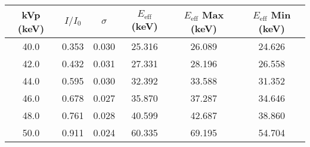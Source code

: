 \begin{tabular}{cccccc}
\toprule
 kVp (keV) &  $I/I_0$ &  $\sigma$ &  $E_{\text{eff}}$ (keV) &  $E_{\text{eff}}$ Max (keV) &  $E_{\text{eff}}$ Min (keV) \\
\midrule
      40.0 &               0.353 &                                  0.030 &                  25.316 &                      26.089 &                      24.626 \\
      42.0 &               0.432 &                                  0.031 &                  27.331 &                      28.196 &                      26.558 \\
      44.0 &               0.595 &                                  0.030 &                  32.392 &                      33.588 &                      31.352 \\
      46.0 &               0.678 &                                  0.027 &                  35.870 &                      37.287 &                      34.646 \\
      48.0 &               0.761 &                                  0.028 &                  40.599 &                      42.687 &                      38.860 \\
      50.0 &               0.911 &                                  0.024 &                  60.335 &                      69.195 &                      54.704 \\
\bottomrule
\end{tabular}
